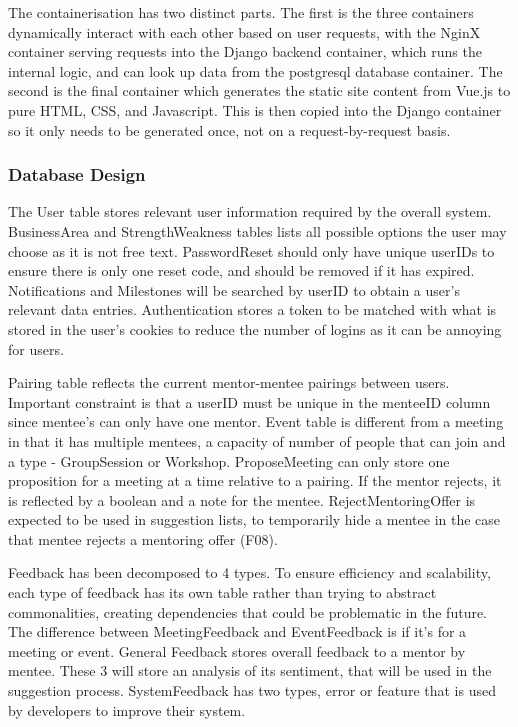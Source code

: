 \documentclass[10pt]{article}
\begin{document}
The containerisation has two distinct parts. The first is the three containers
dynamically interact with each other based on user requests, with the NginX
container serving requests into the Django backend container, which runs the
internal logic, and can look up data from the postgresql database container. The
second is the final container which generates the static site content from
Vue.js to pure HTML, CSS, and Javascript. This is then copied into the Django
container so it only needs to be generated once, not on a request-by-request
basis.

\subsubsection{Database Design}

The User table stores relevant user information required by the overall system.
BusinessArea and StrengthWeakness tables lists all possible options the user may
choose as it is not free text. PasswordReset should only have unique userIDs to
ensure there is only one reset code, and should be removed if it has expired.
Notifications and Milestones will be searched by userID to obtain a user's
relevant data entries. Authentication stores a token to be matched with what is
stored in the user's cookies to reduce the number of logins as it can be
annoying for users.

Pairing table reflects the current mentor-mentee pairings between users.
Important constraint is that a userID must be unique in the menteeID column
since mentee's can only have one mentor. Event table is different from a meeting
in that it has multiple mentees, a capacity of number of people that can join
and a type - GroupSession or Workshop. ProposeMeeting can only store one
proposition for a meeting at a time relative to a pairing. If the mentor
rejects, it is reflected by a boolean and a note for the mentee.
RejectMentoringOffer is expected to be used in suggestion lists, to temporarily
hide a mentee in the case that mentee rejects a mentoring offer (F08).

Feedback has been decomposed to 4 types. To ensure efficiency and scalability,
each type of feedback has its own table rather than trying to abstract
commonalities, creating dependencies that could be problematic in the future.
The difference between MeetingFeedback and EventFeedback is if it's for a
meeting or event. General Feedback stores overall feedback to a mentor by
mentee. These 3 will store an analysis of its sentiment, that will be used in
the suggestion process. SystemFeedback has two types, error or feature that is
used by developers to improve their system.
\end{document}
